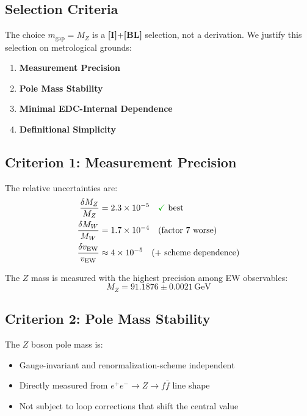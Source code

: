 \documentclass[11pt,a4paper]{article}
\newcommand{\mgap}{m_{\mathrm{gap}}}
\newcommand{\MZ}{M_Z}
\newcommand{\MW}{M_W}
\newcommand{\vEW}{v_{\mathrm{EW}}}
\newcommand{\GeV}{\,\mathrm{GeV}}
\newcommand{\emark}{\textcolor{green!70!black}{\checkmark}}
\newcommand{\tagI}{\textbf{[I]}}
\newcommand{\tagBL}{\textbf{[BL]}}
\theoremstyle{definition}
\theoremstyle{plain}
\theoremstyle{remark}
\begin{document}
\subsection{Selection Criteria}

The choice $\mgap = \MZ$ is a \tagI{}+\tagBL{} selection, not a derivation.
We justify this selection on metrological grounds:

\begin{enumerate}
\item \textbf{Measurement Precision}
\item \textbf{Pole Mass Stability}
\item \textbf{Minimal EDC-Internal Dependence}
\item \textbf{Definitional Simplicity}
\end{enumerate}

\subsection{Criterion 1: Measurement Precision}

The relative uncertainties are:
\begin{align}
\frac{\delta\MZ}{\MZ} &= 2.3 \times 10^{-5} \quad \text{\emark\ best} \label{eq:prec-MZ} \\
\frac{\delta\MW}{\MW} &= 1.7 \times 10^{-4} \quad \text{(factor 7 worse)} \label{eq:prec-MW} \\
\frac{\delta\vEW}{\vEW} &\approx 4 \times 10^{-5} \quad \text{(+ scheme dependence)} \label{eq:prec-vEW}
\end{align}

The $Z$ mass is measured with the highest precision among EW observables:
\begin{equation}
\MZ = 91.1876 \pm 0.0021\GeV
\label{eq:MZ-precision}
\end{equation}

\subsection{Criterion 2: Pole Mass Stability}

The $Z$ boson pole mass is:
\begin{itemize}
\item Gauge-invariant and renormalization-scheme independent
\item Directly measured from $e^+e^- \to Z \to f\bar{f}$ line shape
\item Not subject to loop corrections that shift the central value
\end{itemize}
\end{document}
